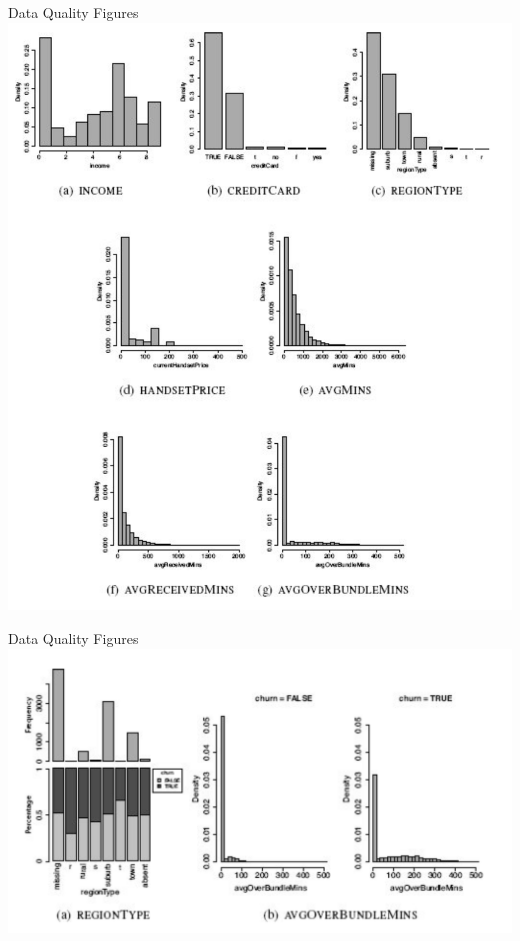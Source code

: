 \documentclass[aspectratio=169,xcolor=dvipsnames]{beamer}
\begin{document}
\begin{frame}{Data Quality Figures}
\centering
\includegraphics[scale=0.25]{images/first_figures.png}
\end{frame}

\begin{frame}{Data Quality Figures}
\centering
\includegraphics[scale=0.5]{images/second_figures.png}
\end{frame}
\end{document}
